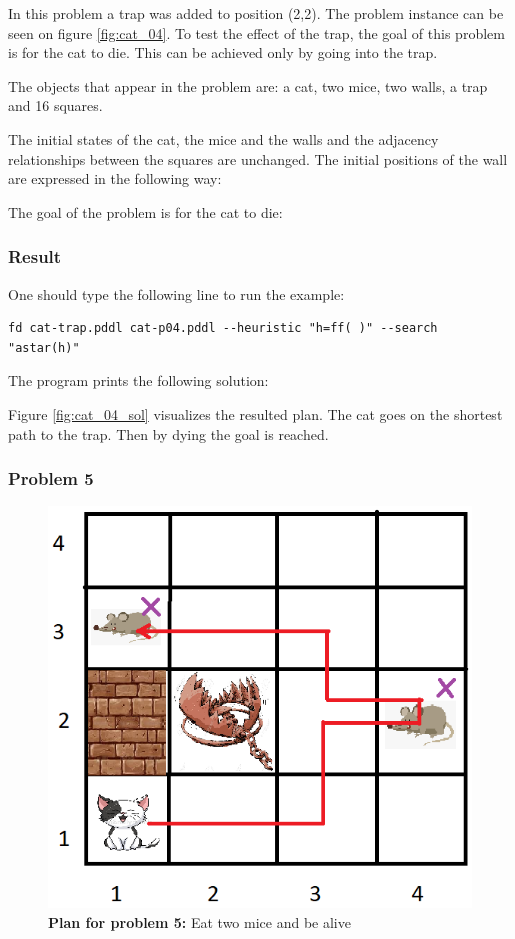 In this problem a trap was added to position (2,2). The problem instance can be seen on figure \ref{fig:cat_04}. To test the effect of the trap, the goal of this problem is for the cat to die. This can be achieved only by going into the trap.

The objects that appear in the problem are: a cat, two mice, two walls, a trap and 16 squares.



The initial states of the cat, the mice and the walls and the adjacency relationships between the squares are unchanged. The initial positions of the wall are expressed in the following way:




The goal of the problem is for the cat to die:




\subsubsection{Result}

One should type the following line to run the example: 

\begin{lstlisting}[numbers=none]
fd cat-trap.pddl cat-p04.pddl --heuristic "h=ff( )" --search "astar(h)"
\end{lstlisting}

The program prints the following solution:



Figure \ref{fig:cat_04_sol} visualizes the resulted plan. The cat goes on the shortest path to the trap. Then by dying the goal is reached.



\subsubsection{Problem 5}

\begin{figure}[H]
    \centering
    \includegraphics[width=.5\linewidth]{fig/A3/cat_05_sol.png}
    \caption{\textbf{Plan for problem 5:} Eat two mice and be alive}
    \label{fig:cat_05_sol}
\end{figure}

